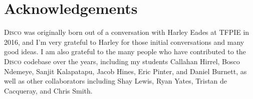 \documentclass[submission,copyright,creativecommons]{eptcs}
\newcommand{\disco}{\textsc{Disco}\xspace}
\begin{document}
\section{Acknowledgements}
\label{sec:acks}

\disco was originally born out of a conversation with Harley Eades at
TFPIE in 2016, and I'm very grateful to Harley for those initial
conversations and many good ideas.  I am also grateful to the many
people who have contributed to the \disco codebase over the years,
including my students Callahan Hirrel, Bosco Ndemeye, Sanjit
Kalapatapu, Jacob Hines, Eric Pinter, and Daniel Burnett, as well as
other collaborators including Shay Lewis, Ryan Yates, Tristan de
Cacqueray, and Chris Smith.



\end{document}
